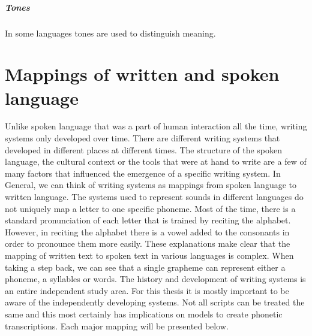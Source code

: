 \subparagraph{Tones} In some languages tones are used to distinguish meaning. 


\section{Mappings of written and spoken language}
\label{writing-sys}

Unlike spoken language that was a part of human interaction all the time, writing systems only developed over time. There are different writing systems that developed in different places at different times. The structure of the spoken language, the cultural context or the tools that were at hand to write are a few of many factors that influenced the emergence of a specific writing system. In General, we can think of writing systems as mappings from spoken language to written language. The systems used to represent sounds in different languages do not uniquely map a letter to one specific phoneme. Most of the time, there is a standard pronunciation of each letter that is trained by reciting the alphabet. However, in reciting the alphabet there is a vowel added to the consonants in order to pronounce them more easily. These explanations make clear that the mapping of written text to spoken text in various languages is complex. When taking a step back, we can see that a single grapheme can represent either a phoneme, a syllables or words. The history and development of writing systems is an entire independent study area. For this thesis it is mostly important to be aware of the independently developing systems. Not all scripts can be treated the same and this most certainly has implications on models to create phonetic transcriptions. Each major mapping will be presented below.


